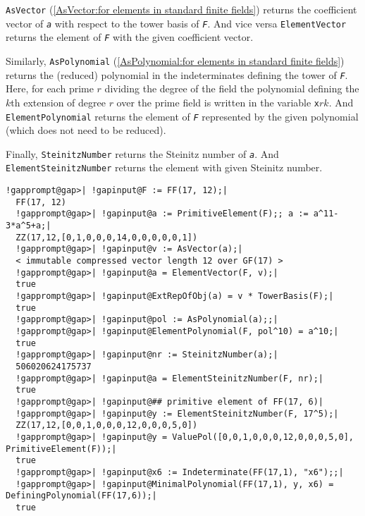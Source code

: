\documentclass[a4paper,11pt]{report}
\begin{document}
{{{ \texttt{AsVector} (\ref{AsVector:for elements  in standard finite fields}) returns the coefficient vector of \mbox{\texttt{\mdseries\slshape a}} with respect to the tower basis of \mbox{\texttt{\mdseries\slshape F}}. And vice versa \texttt{ElementVector} returns the element of \mbox{\texttt{\mdseries\slshape F}} with the given coefficient vector. 

 Similarly, \texttt{AsPolynomial} (\ref{AsPolynomial:for elements  in standard
finite   fields}) returns the (reduced) polynomial in the indeterminates defining the tower of \mbox{\texttt{\mdseries\slshape F}}. Here, for each prime $r$ dividing the degree of the field the polynomial defining the $k$\texttt{}th extension of degree $r$ over the prime field is written in the variable \texttt{x}$r$\texttt{{\textunderscore}}$k$. And \texttt{ElementPolynomial} returns the element of \mbox{\texttt{\mdseries\slshape F}} represented by the given polynomial (which does not need to be reduced). 

 Finally, \texttt{SteinitzNumber} returns the Steinitz number of \mbox{\texttt{\mdseries\slshape a}}. And \texttt{ElementSteinitzNumber} returns the element with given Steinitz number. 
\begin{Verbatim}[commandchars=!@|,fontsize=\small,frame=single,label=Example]
  !gapprompt@gap>| !gapinput@F := FF(17, 12);|
  FF(17, 12)
  !gapprompt@gap>| !gapinput@a := PrimitiveElement(F);; a := a^11-3*a^5+a;|
  ZZ(17,12,[0,1,0,0,0,14,0,0,0,0,0,1])
  !gapprompt@gap>| !gapinput@v := AsVector(a);|
  < immutable compressed vector length 12 over GF(17) >
  !gapprompt@gap>| !gapinput@a = ElementVector(F, v);|
  true
  !gapprompt@gap>| !gapinput@ExtRepOfObj(a) = v * TowerBasis(F);|
  true
  !gapprompt@gap>| !gapinput@pol := AsPolynomial(a);;|
  !gapprompt@gap>| !gapinput@ElementPolynomial(F, pol^10) = a^10;|
  true
  !gapprompt@gap>| !gapinput@nr := SteinitzNumber(a);|
  506020624175737
  !gapprompt@gap>| !gapinput@a = ElementSteinitzNumber(F, nr);|
  true
  !gapprompt@gap>| !gapinput@## primitive element of FF(17, 6)|
  !gapprompt@gap>| !gapinput@y := ElementSteinitzNumber(F, 17^5);|
  ZZ(17,12,[0,0,1,0,0,0,12,0,0,0,5,0])
  !gapprompt@gap>| !gapinput@y = ValuePol([0,0,1,0,0,0,12,0,0,0,5,0], PrimitiveElement(F));|
  true
  !gapprompt@gap>| !gapinput@x6 := Indeterminate(FF(17,1), "x6");;|
  !gapprompt@gap>| !gapinput@MinimalPolynomial(FF(17,1), y, x6) = DefiningPolynomial(FF(17,6));|
  true
\end{Verbatim}
 }

 }

}
\end{document}
